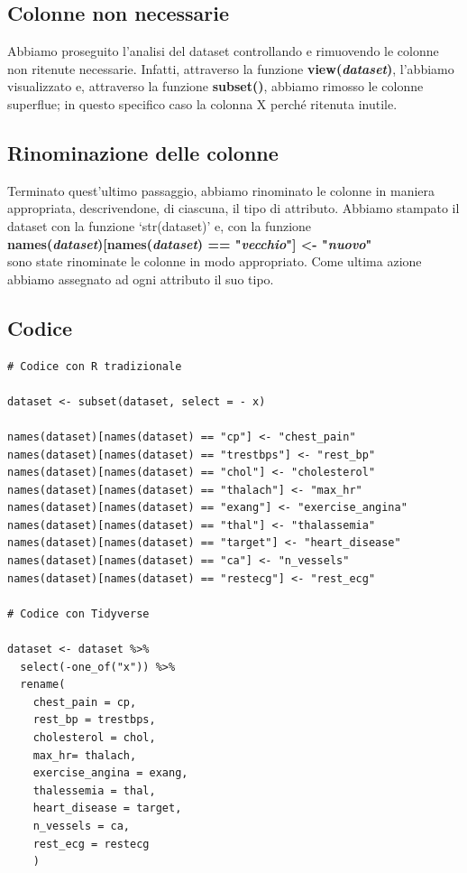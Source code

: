 \documentclass{article}
\begin{document}
\subsection{ Colonne non necessarie }
Abbiamo proseguito l’analisi del dataset controllando e rimuovendo le colonne non ritenute necessarie. Infatti, attraverso la funzione \textbf{view(\textit{dataset})}, l’abbiamo visualizzato e, attraverso la funzione \textbf{subset()}, abbiamo rimosso le colonne superflue; in questo specifico caso la colonna X perché ritenuta inutile.

\subsection { Rinominazione delle colonne }
Terminato quest’ultimo passaggio, abbiamo rinominato le colonne in maniera appropriata, descrivendone, di ciascuna, il tipo di attributo. 
Abbiamo stampato il dataset con la funzione ‘str(dataset)’ e, con la funzione \\\textbf{names(\textit{dataset})[names(\textit{dataset}) == "\textit{vecchio}"] \textless- "\textit{nuovo}"}\\  sono state rinominate le colonne in modo appropriato. Come ultima azione abbiamo assegnato ad ogni attributo il suo tipo.

\subsection { Codice }
\begin{lstlisting}
# Codice con R tradizionale 

dataset <- subset(dataset, select = - x)

names(dataset)[names(dataset) == "cp"] <- "chest_pain"
names(dataset)[names(dataset) == "trestbps"] <- "rest_bp"
names(dataset)[names(dataset) == "chol"] <- "cholesterol"
names(dataset)[names(dataset) == "thalach"] <- "max_hr"
names(dataset)[names(dataset) == "exang"] <- "exercise_angina"
names(dataset)[names(dataset) == "thal"] <- "thalassemia"
names(dataset)[names(dataset) == "target"] <- "heart_disease"
names(dataset)[names(dataset) == "ca"] <- "n_vessels"
names(dataset)[names(dataset) == "restecg"] <- "rest_ecg"

# Codice con Tidyverse

dataset <- dataset %>%  
  select(-one_of("x")) %>%
  rename(
    chest_pain = cp,
    rest_bp = trestbps,
    cholesterol = chol,
    max_hr= thalach,
    exercise_angina = exang,
    thalessemia = thal,
    heart_disease = target,
    n_vessels = ca,
    rest_ecg = restecg
    )

 \end{lstlisting}
\end{document}
